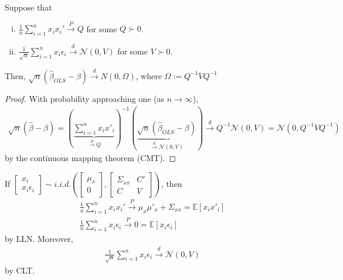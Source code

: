 \documentclass[11pt]{elegantbook}
\begin{document}
\begin{lemma}
    Suppose that
    \begin{enumerate}[(i).]
        \item $\frac{1}{n}\sum_{i=1}^n x_ix_i' \stackrel{P}{\longrightarrow} Q$ for some $Q\succ 0$.
        \item $\frac{1}{\sqrt{n}}\sum_{i=1}^n x_i\epsilon_i \stackrel{d}{\longrightarrow} \mathcal{N}(0,V)$ for some $V\succ 0$.
    \end{enumerate}
    Then, $\sqrt{n}\left(\hat{\beta}_{OLS}-\beta\right) \stackrel{d}{\longrightarrow} N\left(0,\Omega\right)$, where $\Omega:=Q^{-1} V Q^{-1}$
\end{lemma}
\begin{proof}
    With probability approaching one (as $n\to\infty$),
    \begin{equation}
        \begin{aligned}
            \sqrt{n}(\hat{\beta}-\beta)=\left(\underbrace{\sum_{i=1}^n x_ix'_i}_{\stackrel{P}{\longrightarrow} Q}\right)^{-1}\left(\underbrace{\sqrt{n}\left(\hat{\beta}_{OLS}-\beta\right)}_{\stackrel{d}{\longrightarrow} \mathcal{N}(0,V)}\right)\stackrel{d}{\longrightarrow} Q^{-1}\mathcal{N}(0,V)=\mathcal{N}(0,Q^{-1}VQ^{-1})
        \end{aligned}
        \nonumber
    \end{equation}
    by the continuous mapping theorem (CMT).
\end{proof}
\begin{remark}
    If $\begin{bmatrix}
        x_i\\
        x_i\epsilon_i
    \end{bmatrix}\sim i.i.d. \left(\begin{bmatrix}
        \mu_x\\
        0
    \end{bmatrix},\begin{bmatrix}
        \Sigma_{xx}&	C'\\
        C & V
    \end{bmatrix}\right)$, then
    \begin{equation}
        \begin{aligned}
            \frac{1}{n}\sum_{i=1}^n x_ix_i' \stackrel{P}{\longrightarrow} \mu_x\mu'_x+\Sigma_{xx}=\mathbb{E}[x_ix'_i]\\
            \frac{1}{n}\sum_{i=1}^n x_i\epsilon_i \stackrel{P}{\longrightarrow} 0=\mathbb{E}[x_i\epsilon_i]
        \end{aligned}
        \nonumber
    \end{equation}
    by LLN. Moreover,
    \begin{equation}
        \begin{aligned}
            \frac{1}{\sqrt{n}}\sum_{i=1}^n x_i\epsilon_i \stackrel{d}{\longrightarrow} \mathcal{N}(0,V)
        \end{aligned}
        \nonumber
    \end{equation}
    by CLT.
\end{remark}
\end{document}
